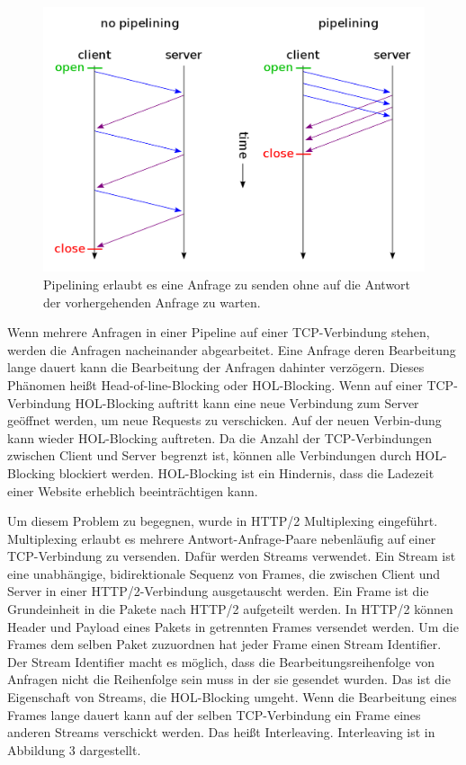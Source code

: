 \documentclass{llncs}
\begin{document}
\begin{figure}[!ht]
\includegraphics[width=\columnwidth]{1200px-HTTP_pipelining2}
\caption{Pipelining erlaubt es eine Anfrage zu senden ohne auf die Antwort der vorhergehenden Anfrage zu warten.}
\end{figure}
Wenn mehrere Anfragen in einer Pipeline auf einer TCP-Verbindung stehen, werden die Anfragen nacheinander abgearbeitet. Eine Anfrage deren Bearbeitung lange dauert kann die Bearbeitung der Anfragen dahinter verzögern. Dieses Phänomen heißt Head-of-line-Blocking oder HOL-Blocking. Wenn auf einer TCP-Verbindung HOL-Blocking auftritt kann eine neue Verbindung zum Server geöffnet werden, um neue Requests zu verschicken. Auf der neuen Verbin-dung kann wieder HOL-Blocking auftreten. Da die Anzahl der TCP-Verbindungen zwischen Client und Server begrenzt ist, können alle Verbindungen durch HOL-Blocking blockiert werden. HOL-Blocking ist ein Hindernis, dass die Ladezeit einer Website erheblich beeinträchtigen kann.

Um diesem Problem zu begegnen, wurde in HTTP/2 Multiplexing eingeführt. Multiplexing erlaubt es mehrere Antwort-Anfrage-Paare nebenläufig auf einer TCP-Verbindung zu versenden. Dafür werden Streams verwendet.
Ein Stream ist eine unabhängige, bidirektionale Sequenz von Frames, die zwischen Client und Server in einer HTTP/2-Verbindung ausgetauscht werden.\cite{Belshe2015}
Ein Frame ist die Grundeinheit in die Pakete nach HTTP/2 aufgeteilt werden. In HTTP/2 können Header und Payload eines Pakets in getrennten Frames versendet werden. Um die Frames dem selben Paket zuzuordnen hat jeder Frame einen Stream Identifier. Der Stream Identifier macht es möglich, dass die Bearbeitungsreihenfolge von Anfragen nicht die Reihenfolge sein muss in der sie gesendet wurden. Das ist die Eigenschaft von Streams, die HOL-Blocking umgeht. Wenn die Bearbeitung eines Frames lange dauert kann auf der selben TCP-Verbindung ein Frame eines anderen Streams verschickt werden. Das heißt Interleaving. Interleaving ist in Abbildung 3 dargestellt.
\end{document}
